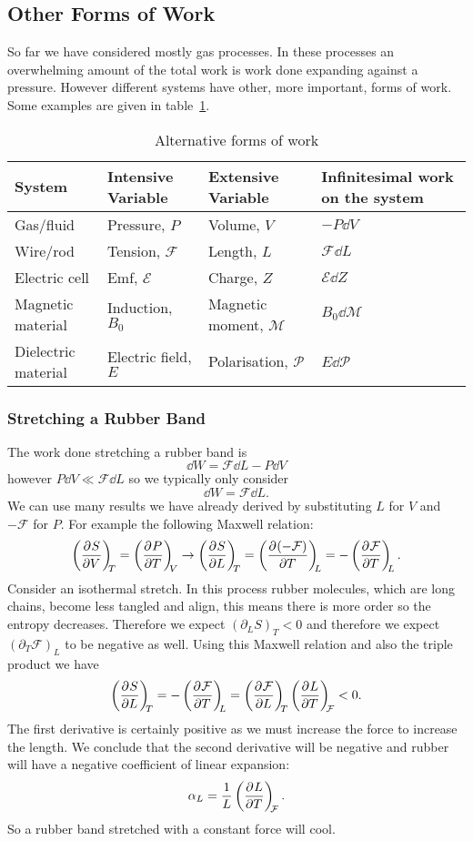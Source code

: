 \documentclass[a4paper]{article}
\begin{document}
    \subsection{Other Forms of Work}
    So far we have considered mostly gas processes.
    In these processes an overwhelming amount of the total work is work done expanding against a pressure.
    However different systems have other, more important, forms of work.
    Some examples are given in table~\ref{tab:alternative forms of work}.
    \begin{table}
        \centering
        \begin{tabular}{llll}\hline
            System & Intensive Variable & Extensive Variable & Infinitesimal work on the system\\\hline
            Gas/fluid & Pressure, \(P\) & Volume, \(V\) & \(-P\dd{V}\)\\
            Wire/rod & Tension, \(\mathcal{F}\) & Length, \(L\) & \(\mathcal{F}\dd{L}\)\\
            Electric cell & Emf, \(\mathcal{E}\) & Charge, \(Z\) & \(\mathcal{E}\dd{Z}\)\\
            Magnetic material & Induction, \(B_0\) & Magnetic moment, \(\mathcal{M}\) & \(B_0\dd{\mathcal{M}}\)\\
            Dielectric material & Electric field, \(E\) & Polarisation, \(\mathcal{P}\) & \(E\dd{\mathcal{P}}\)\\\hline
        \end{tabular}
        \caption{Alternative forms of work}
        \label{tab:alternative forms of work}
    \end{table}

    \subsubsection{Stretching a Rubber Band}
    The work done stretching a rubber band is
    \[\dd{W} = \mathcal{F}\dd{L} - P\dd{V}\]
    however \(P\dd{V}\ll \mathcal{F}\dd{L}\) so we typically only consider
    \[\dd{W} = \mathcal{F}\dd{L}.\]
    We can use many results we have already derived by substituting \(L\) for \(V\) and \(-\mathcal{F}\) for \(P\).
    For example the following Maxwell relation:
    \[\pdvconst{S}{V}{T} = \pdvconst{P}{T}{V} \rightarrow \pdvconst{S}{L}{T} = \pdvconst{(-\mathcal{F})}{T}{L} = -\pdvconst{\mathcal{F}}{T}{L}.\]
    Consider an isothermal stretch.
    In this process rubber molecules, which are long chains, become less tangled and align, this means there is more order so the entropy decreases.
    Therefore we expect \((\partial_LS)_T < 0\) and therefore we expect \((\partial_T\mathcal{F})_L\) to be negative as well.
    Using this Maxwell relation and also the triple product we have
    \[\pdvconst{S}{L}{T} = -\pdvconst{\mathcal{F}}{T}{L} = \pdvconst{\mathcal{F}}{L}{T}\pdvconst{L}{T}{\mathcal{F}} < 0.\]
    The first derivative is certainly positive as we must increase the force to increase the length.
    We conclude that the second derivative will be negative and rubber will have a negative coefficient of linear expansion:
    \[\alpha_L = \frac{1}{L}\left(\pdv[]{L}{T}\right)_{\!\!{\mathcal{F}}}.\]
    So a rubber band stretched with a constant force will cool.
    
\end{document}

